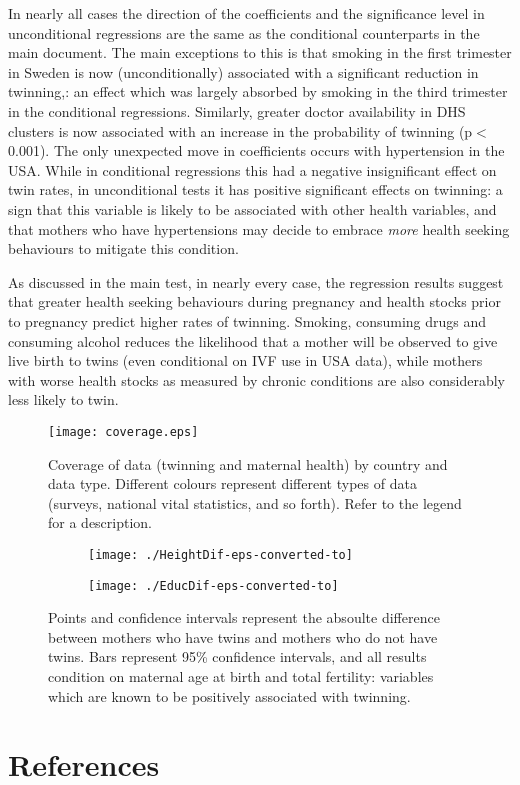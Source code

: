 \documentclass{nature}
\begin{document}
\begin{linenumbers}
In nearly all cases the direction of the coefficients and the significance level in unconditional regressions are the same as the conditional counterparts in the main document.  The main exceptions to this is that smoking in the first trimester in Sweden is now (unconditionally) associated with a significant reduction in twinning,: an effect which was largely absorbed by smoking in the third trimester in the conditional regressions.  Similarly, greater doctor availability in DHS clusters is now associated with an increase in the probability of twinning (p$<$0.001).  The only unexpected move in coefficients occurs with hypertension in the USA.  While in conditional regressions this had a negative insignificant effect on twin rates, in unconditional tests it has positive significant effects on twinning: a sign that this variable is likely to be associated with other health variables, and that mothers who have hypertensions may decide to embrace \emph{more} health seeking behaviours to mitigate this condition.

As discussed in the main test, in nearly every case, the regression results suggest that greater health seeking behaviours during pregnancy and health stocks prior to pregnancy predict higher rates of twinning.  Smoking, consuming drugs and consuming alcohol reduces the likelihood that a mother will be observed to give live birth to twins (even conditional on IVF use in USA data), while mothers with worse health stocks as measured by chronic conditions are also considerably less likely to twin.





\clearpage
\begin{figure}[ht!]
\texttt{[image: coverage.eps]}
\caption{Coverage of data (twinning and maternal health) by country and data type.  Different colours represent different types of data (surveys, national vital statistics, and so forth).  Refer to the legend for a description.}
\label{fig:twincoverage}
\end{figure}

\begin{figure}[htpb!]
\begin{subfigure}{.5\textwidth}
  \texttt{[image: ./HeightDif-eps-converted-to]}
\end{subfigure}%
\begin{subfigure}{.5\textwidth}
  \texttt{[image: ./EducDif-eps-converted-to]}
\end{subfigure}
\caption{Points and confidence intervals represent the absoulte difference between mothers who have twins and mothers who do not have twins.  Bars represent 95\% confidence intervals, and all results condition on maternal age at birth and total fertility: variables which are known to be positively associated with twinning.}
\end{figure}

\clearpage


\clearpage
\section*{References}



\end{linenumbers}
\end{document}
